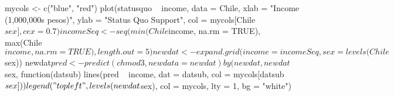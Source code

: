 \begin{Schunk}
\begin{Sinput}
 mycols <- c("blue", "red")
 plot(statusquo ~ income, data = Chile, xlab = "Income (1,000,000s pesos)", ylab = "Status Quo Support", col = mycols[Chile$sex], cex = 0.7 )
 incomeSeq <- seq(min(Chile$income, na.rm = TRUE), 
                   max(Chile$income, na.rm = TRUE), length.out = 5)
 newdat <- expand.grid(income = incomeSeq, sex = levels(Chile$sex))
 newdat$pred <- predict(chmod3, newdata = newdat)
 by(newdat, newdat$sex, function(datsub) lines(pred ~ income, dat =  datsub, col = mycols[datsub$sex]))
 legend("topleft", levels(newdat$sex), col = mycols, lty = 1, bg = "white")
\end{Sinput}
\end{Schunk}
